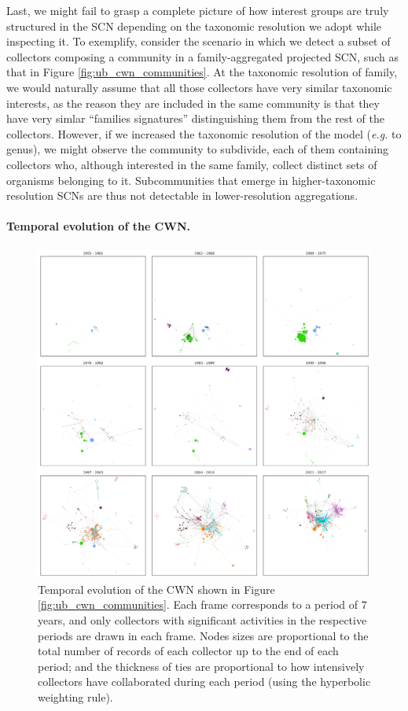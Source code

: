 Last, we might fail to grasp a complete picture of how interest groups are truly structured in the SCN depending on the taxonomic resolution we adopt while inspecting it.
To exemplify, consider the scenario in which we detect a subset of collectors composing a community in a family-aggregated projected SCN, such as that in Figure \ref{fig:ub_cwn_communities}.
At the taxonomic resolution of family, we would naturally assume that all those collectors have very similar taxonomic interests, as the reason they are included in the same community is that they have very simlar ``families signatures'' distinguishing them from the rest of the collectors. 
However, if we increased the taxonomic resolution of the model (\textit{e.g.} to genus), we might observe the community to subdivide, each of them containing collectors who, although interested in the same family, collect distinct sets of organisms belonging to it.
Subcommunities that emerge in higher-taxonomic resolution SCNs are thus not detectable in lower-resolution aggregations.


\paragraph{Temporal evolution of the CWN.}

\begin{figure}[h!]
  	\centering
    \includegraphics[width=\linewidth]{figures/casestudy_ub/cwn_temporal_evol.png}
    \caption[Temporal evolution of the UB CWN.]{ Temporal evolution of the CWN shown in Figure \ref{fig:ub_cwn_communities}. Each frame corresponds to a period of $7$ years, and only collectors with significant activities in the respective periods are drawn in each frame. Nodes sizes are proportional to the total number of records of each collector up to the end of each period; and the thickness of ties are proportional to how intensively collectors have collaborated during each period (using the hyperbolic weighting rule). }
    \label{fig:ub_cwn_temporal_evol}
\end{figure}

